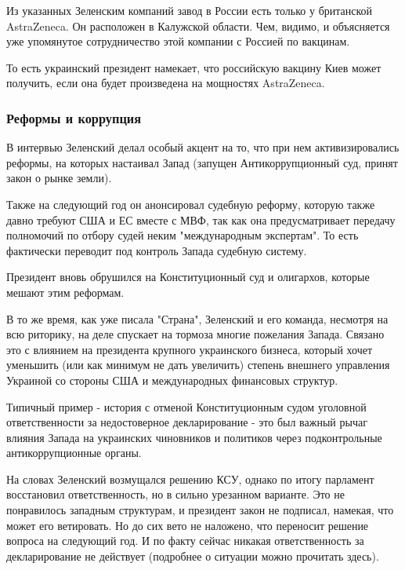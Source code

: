 {Из указанных Зеленским компаний завод в России есть только у британской
AstraZeneca. Он расположен в Калужской области. Чем, видимо, и объясняется уже
упомянутое сотрудничество этой компании с Россией по вакцинам. 

То есть украинский президент намекает, что российскую вакцину Киев может
получить, если она будет произведена на мощностях AstraZeneca.

\subsubsection{Реформы и коррупция}

В интервью Зеленский делал особый акцент на то, что при нем активизировались
реформы, на которых настаивал Запад (запущен Антикоррупционный суд, принят
закон о рынке земли). 

Также на следующий год он анонсировал судебную реформу, которую также давно
требуют США и ЕС вместе с МВФ, так как она предусматривает передачу полномочий
по отбору судей неким "международным экспертам". То есть фактически переводит
под контроль Запада судебную систему.

Президент вновь обрушился на Конституционный суд и олигархов, которые мешают
этим реформам.

В то же время, как уже писала "Страна", Зеленский и его команда, несмотря на
всю риторику, на деле спускает на тормоза многие пожелания Запада. Связано это
с влиянием на президента крупного украинского бизнеса, который хочет уменьшить
(или как минимум не дать увеличить) степень внешнего управления Украиной со
стороны США и международных финансовых структур.

Типичный пример - история с отменой Конституционным судом уголовной
ответственности за недостоверное декларирование - это был важный рычаг влияния
Запада на украинских чиновников и политиков через подконтрольные
антикоррупционные органы.

На словах Зеленский возмущался решению КСУ, однако по итогу парламент
восстановил ответственность, но в сильно урезанном варианте. Это не понравилось
западным структурам, и президент закон не подписал, намекая, что может его
ветировать. Но до сих вето не наложено, что переносит решение вопроса на
следующий год. И по факту сейчас никакая ответственность за декларирование не
действует (подробнее о ситуации можно прочитать здесь).

}
